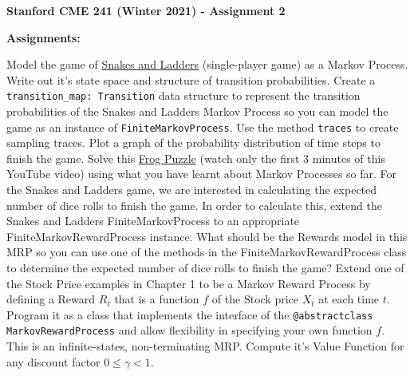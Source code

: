 \documentclass[12pt]{exam}
\begin{document}
\begin{center}
{\large {\bf Stanford CME 241 (Winter 2021) - Assignment 2}}
\end{center}
 
{\large{\bf Assignments:}}
\begin{questions}
\question Model the game of \href{https://toytheater.com/snakes-and-ladders/}{Snakes and Ladders} (single-player game) as a Markov Process. Write out it's state space and structure of transition probabilities.
\question Create a \lstinline{transition_map: Transition} data structure to represent the transition probabilities of the Snakes and Ladders Markov Process so you can model the game as an instance of \lstinline{FiniteMarkovProcess}. Use the method \lstinline{traces} to create sampling traces. Plot a graph of the probability distribution of time steps to finish the game.
\question Solve this \href{https://www.youtube.com/watch?v=ZLTyX4zL2Fc}{Frog Puzzle} (watch only the first 3 minutes of this YouTube video) using what you have learnt about Markov Processes so far.
\question For the Snakes and Ladders game, we are interested in calculating the expected number of dice rolls to finish the game. In order to calculate this, extend the Snakes and Ladders FiniteMarkovProcess to an appropriate FiniteMarkovRewardProcess instance. What should be the Rewards model in this MRP so you can use one of the methods in the FiniteMarkovRewardProcess class to determine the expected number of dice rolls to finish the game?
\question Extend one of the Stock Price examples in Chapter 1 to be a Markov Reward Process by defining a Reward $R_t$ that is a function $f$ of the Stock price $X_t$ at each time $t$. Program it as a class that implements the interface of the \lstinline{@abstractclass MarkovRewardProcess} and allow flexibility in specifying your own function $f$. This is an infinite-states, non-terminating MRP. Compute it's Value Function for any discount factor $0 \leq \gamma < 1$.
\end{questions}
\end{document}

